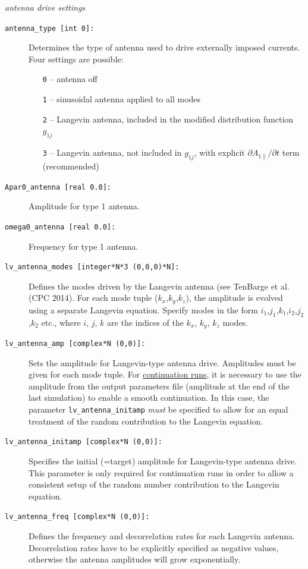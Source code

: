 \documentclass[12pt]{article}
\begin{document}
%
{\noindent\em antenna drive settings}
\begin{description}
\item[\hypertarget{antenna_type}{\tt antenna\_type [int 0]:}] Determines the type of antenna used to
drive externally imposed currents. Four settings are possible:
\begin{itemize}
\item[{\tt 0}] -- antenna off
\item[{\tt 1}] -- sinusoidal antenna applied to all modes
\item[{\tt 2}] -- Langevin antenna, included in the modified distribution function $g_{1j}$
\item[{\tt 3}] -- Langevin antenna, not included in $g_{1j}$, with explicit $\partial A_{1\|}/\partial t$ term (recommended)
\end{itemize}
\item[\hypertarget{Apar0_antenna}{\tt Apar0\_antenna [real 0.0]:}] Amplitude for type 1 antenna.
\item[\hypertarget{omega0_antenna}{\tt omega0\_antenna [real 0.0]:}] Frequency for type 1 antenna.
\item[\hypertarget{lv_antenna_modes}{\tt lv\_antenna\_modes [integer*N*3 (0,0,0)*N]:}] Defines the
modes driven by the Langevin antenna (see TenBarge et al. (CPC 2014). For each mode tuple ($k_x$,$k_y$,$k_z$),
the amplitude is evolved using a separate Langevin equation. Specify modes in the form
$i_1$,$j_1$,$k_1$,$i_2$,$j_2$,$k_2$ etc., where $i$, $j$, $k$ are the indices of the $k_x$, $k_y$, $k_z$ modes.
\item[\hypertarget{lv_antenna_amp}{\tt lv\_antenna\_amp [complex*N (0,0)]:}] Sets the amplitude for
Langevin-type antenna drive. Amplitudes must be given for each mode tuple. For \hyperref[subsubsec:continue_sim]{continuation runs}, it is
necessary to use the amplitude from the output parameters file (amplitude at the end of the last simulation)
to enable a smooth continuation. In this case, the parameter {\tt lv\_antenna\_initamp} {\em must} be
specified to allow for an equal treatment of the random contribution to the Langevin equation.
\item[\hypertarget{lv_antenna_initamp}{\tt lv\_antenna\_initamp [complex*N (0,0)]:}] Specifies the initial
(=target) amplitude for Langevin-type antenna drive. This parameter is only required for continuation runs in order
to allow a consistent setup of the random number contribution to the Langevin equation.
\item[\hypertarget{lv_antenna_freq}{\tt lv\_antenna\_freq [complex*N (0,0)]:}] Defines the frequency and
decorrelation rates for each Langevin antenna. Decorrelation rates have to be explicitly specified as
negative values, otherwise the antenna amplitudes will grow exponentially.
\end{description}
\end{document}
